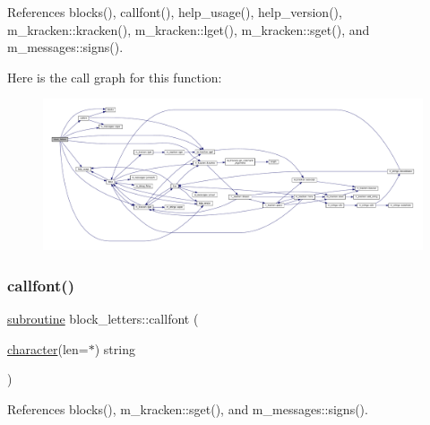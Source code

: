 References blocks(), callfont(), help\+\_\+usage(), help\+\_\+version(), m\+\_\+kracken\+::kracken(), m\+\_\+kracken\+::lget(), m\+\_\+kracken\+::sget(), and m\+\_\+messages\+::signs().

Here is the call graph for this function\+:
\nopagebreak
\begin{figure}[H]
\begin{center}
\leavevmode
\includegraphics[width=350pt]{note_8f90_a783e8e0dd3deddd7a125ab0a6f20341c_cgraph}
\end{center}
\end{figure}
\mbox{\label{note_8f90_a05dfb57174f958e4973af20d00512f49}} 
\subsubsection{\texorpdfstring{callfont()}{callfont()}}
{\footnotesize\ttfamily \hyperlink{M__stopwatch_83_8txt_acfbcff50169d691ff02d4a123ed70482}{subroutine} block\+\_\+letters\+::callfont (\begin{DoxyParamCaption}\item[{\hyperlink{option__stopwatch_83_8txt_abd4b21fbbd175834027b5224bfe97e66}{character}(len=$\ast$)}]{string }\end{DoxyParamCaption})}



References blocks(), m\+\_\+kracken\+::sget(), and m\+\_\+messages\+::signs().

